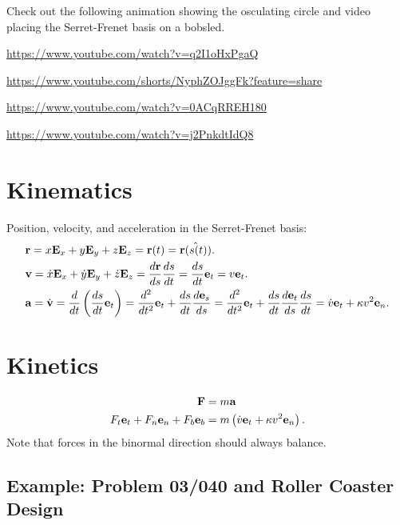 \documentclass[
  letterpaper,
  DIV=11,
  numbers=noendperiod]{scrreprt}
\newcommand{\lp}{\left(}
\newcommand{\rp}{\right)}
\begin{document}
Check out the following animation showing the osculating circle and
video placing the Serret-Frenet basis on a bobsled.

\url{https://www.youtube.com/watch?v=q2I1oHxPgaQ}

\url{https://www.youtube.com/shorts/NyphZOJggFk?feature=share}

\url{https://www.youtube.com/watch?v=0ACqRREH180}

\url{https://www.youtube.com/watch?v=j2PnkdtIdQ8}

\section{Kinematics}\label{kinematics-1}

Position, velocity, and acceleration in the Serret-Frenet basis:
\begin{align*}
    & {\bf r} = x{\bf E}_x+y{\bf E}_y+z{\bf E}_z = {\bf r}(t) = \hat{{\bf r}(s(t))}.\\
    & {\bf v} = \dot{x}{\bf E}_x+\dot{y}{\bf E}_y+\dot{z}{\bf E}_z = \frac{d{\bf r}}{ds}\frac{ds}{dt} = \frac{ds}{dt}{\bf e}_t = v{\bf e}_t.\\
    & {\bf a} = \dot{\bf v} = \frac{d}{dt}\lp\frac{ds}{dt}{\bf e}_t\rp = \frac{d^2}{dt^2}{\bf e}_t+\frac{ds}{dt}\frac{d{\bf e}_s}{ds} = \frac{d^2}{dt^2}{\bf e}_t+\frac{ds}{dt}\frac{d{\bf e}_t}{ds}\frac{ds}{dt} = \dot{v}{\bf e}_t+\kappa v^2{\bf e}_n.
\end{align*}

\section{Kinetics}\label{kinetics}

\begin{align}
    {\bf F} &= m{\bf a}\\
    F_t{\bf e}_t+F_n{\bf e}_n+F_b{\bf e}_b &= m\lp\dot{v}{\bf e}_t+\kappa v^2{\bf e}_n\rp.
\end{align} Note that forces in the binormal direction should always
balance.

\subsection{Example: Problem 03/040 and Roller Coaster
Design}\label{example-problem-03040-and-roller-coaster-design}
\end{document}

